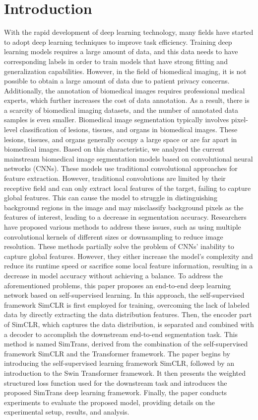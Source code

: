 \documentclass[10pt,twocolumn,a4paper]{article}
\begin{document}
\section{Introduction}
\label{sec:intro}

With the rapid development of deep learning technology, many fields have started to adopt deep learning techniques to improve task efficiency. Training deep learning models requires a large amount of data, and this data needs to have corresponding labels in order to train models that have strong fitting and generalization capabilities. However, in the field of biomedical imaging, it is not possible to obtain a large amount of data due to patient privacy concerns. Additionally, the annotation of biomedical images requires professional medical experts, which further increases the cost of data annotation. As a result, there is a scarcity of biomedical imaging datasets, and the number of annotated data samples is even smaller.
Biomedical image segmentation typically involves pixel-level classification of lesions, tissues, and organs in biomedical images. These lesions, tissues, and organs generally occupy a large space or are far apart in biomedical images. Based on this characteristic, we analyzed the current mainstream biomedical image segmentation models based on convolutional neural networks (CNNs). These models use traditional convolutional approaches for feature extraction. However, traditional convolutions are limited by their receptive field and can only extract local features of the target, failing to capture global features. This can cause the model to struggle in distinguishing background regions in the image and may misclassify background pixels as the features of interest, leading to a decrease in segmentation accuracy. Researchers have proposed various methods to address these issues, such as using multiple convolutional kernels of different sizes or downsampling to reduce image resolution. These methods partially solve the problem of CNNs' inability to capture global features. However, they either increase the model's complexity and reduce its runtime speed or sacrifice some local feature information, resulting in a decrease in model accuracy without achieving a balance.
To address the aforementioned problems, this paper proposes an end-to-end deep learning network based on self-supervised learning. In this approach, the self-supervised framework SimCLR is first employed for training, overcoming the lack of labeled data by directly extracting the data distribution features. Then, the encoder part of SimCLR, which captures the data distribution, is separated and combined with a decoder to accomplish the downstream end-to-end segmentation task. This method is named SimTrans, derived from the combination of the self-supervised framework SimCLR and the Transformer framework.
The paper begins by introducing the self-supervised learning framework SimCLR, followed by an introduction to the Swin Transformer framework. It then presents the weighted structured loss function used for the downstream task and introduces the proposed SimTrans deep learning framework. Finally, the paper conducts experiments to evaluate the proposed model, providing details on the experimental setup, results, and analysis.
\end{document}
